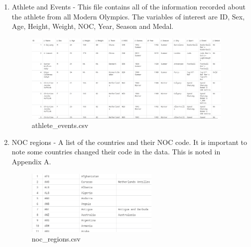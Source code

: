 \documentclass[a4 paper, 12pt]{article}
\begin{document}
        \begin{enumerate}
            \item Athlete and Events - This file contains all of the information recorded about the athlete from all Modern Olympics. The variables of interest are ID, Sex, Age, Height, Weight, NOC, Year, Season and Medal. 
                \begin{figure} [H]
                    \centering
                    \includegraphics[width=0.95\textwidth, frame]
                        {./images/history_data.png} 
                    \caption{athlete\_events.csv}                  
                \end{figure}            
            \item NOC regions - A list of the countries and their NOC code. It is important to note some countries changed their code in the data. This is noted in Appendix A. 
                \begin{figure}[H]
                    \centering
                    \includegraphics[width=0.6\textwidth, frame]
                    {./images/noc_data.png}   
                    \caption{noc\_regions.csv}                 
            \end{figure}
        \end{enumerate}
\end{document}
